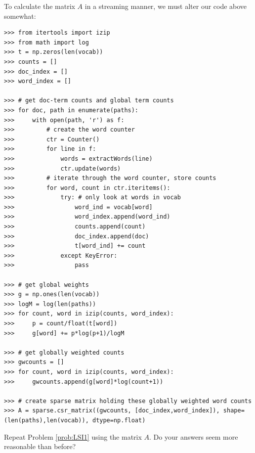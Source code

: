 To calculate the matrix $A$ in a streaming manner, we must alter our code above somewhat:
\begin{lstlisting}
>>> from itertools import izip
>>> from math import log
>>> t = np.zeros(len(vocab))
>>> counts = []
>>> doc_index = []
>>> word_index = []

>>> # get doc-term counts and global term counts
>>> for doc, path in enumerate(paths):
>>>     with open(path, 'r') as f:
>>>         # create the word counter
>>>         ctr = Counter()
>>>         for line in f:
>>>             words = extractWords(line)
>>>             ctr.update(words)
>>>         # iterate through the word counter, store counts
>>>         for word, count in ctr.iteritems():
>>>             try: # only look at words in vocab
>>>                 word_ind = vocab[word]
>>>                 word_index.append(word_ind)
>>>                 counts.append(count)
>>>                 doc_index.append(doc)
>>>                 t[word_ind] += count
>>>             except KeyError:
>>>                 pass

>>> # get global weights
>>> g = np.ones(len(vocab))
>>> logM = log(len(paths))
>>> for count, word in izip(counts, word_index):
>>>     p = count/float(t[word])
>>>     g[word] += p*log(p+1)/logM

>>> # get globally weighted counts
>>> gwcounts = []
>>> for count, word in izip(counts, word_index):
>>>     gwcounts.append(g[word]*log(count+1))

>>> # create sparse matrix holding these globally weighted word counts
>>> A = sparse.csr_matrix((gwcounts, [doc_index,word_index]), shape=(len(paths),len(vocab)), dtype=np.float)
\end{lstlisting}

\begin{problem}
Repeat Problem \ref{prob:LSI1} using the matrix $A$. Do your answers seem more reasonable than before?
\end{problem}
